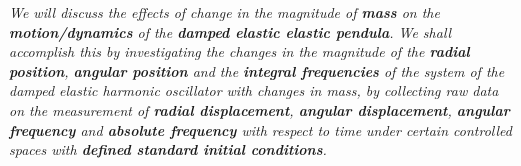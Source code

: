\textit{We will discuss the effects of change in the magnitude of \textbf{mass} on the \textbf{motion/dynamics} of the \textbf{damped elastic elastic pendula}. We shall accomplish this by investigating the changes in the magnitude of the \textbf{radial position}, \textbf{angular position} and the \textbf{integral frequencies} of the system of the damped elastic harmonic oscillator with changes in mass, by collecting raw data on the measurement of \textbf{radial displacement}, \textbf{angular displacement}, \textbf{angular frequency} and \textbf{absolute frequency} with respect to time under certain controlled spaces with \textbf{defined standard initial conditions}.}
